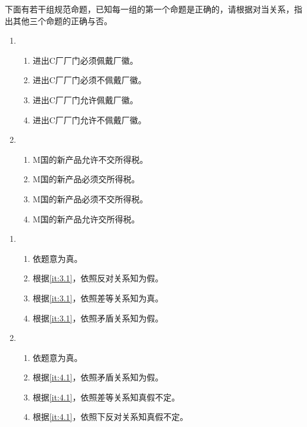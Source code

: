 \documentclass{ctexart}
\begin{document}
\begin{problem}\label{pro:5}
  下面有若干组规范命题，已知每一组的第一个命题是正确的，请根据对当关系，指出其他三个命题的正确与否。
  \begin{enumerate}
    \item
      \begin{enumerate}
        \item 进出C厂厂门必须佩戴厂徽。
        \item 进出C厂厂门必须不佩戴厂徽。
        \item 进出C厂厂门允许佩戴厂徽。
        \item 进出C厂厂门允许不佩戴厂徽。
      \end{enumerate}
    \item
      \begin{enumerate}
        \item M国的新产品允许不交所得税。
        \item M国的新产品必须交所得税。
        \item M国的新产品必须不交所得税。
        \item M国的新产品允许交所得税。
      \end{enumerate}
  \end{enumerate}
  \begin{solution}
    \begin{enumerate}
      \item
        \begin{enumerate}
          \item \label{it:3.1}依题意为真。
          \item 根据\ref{it:3.1}，依照反对关系知为假。
          \item 根据\ref{it:3.1}，依照差等关系知为真。
          \item 根据\ref{it:3.1}，依照矛盾关系知为假。
        \end{enumerate}
      \item
        \begin{enumerate}
          \item \label{it:4.1}依题意为真。
          \item 根据\ref{it:4.1}，依照矛盾关系知为假。
          \item 根据\ref{it:4.1}，依照差等关系知真假不定。
          \item 根据\ref{it:4.1}，依照下反对关系知真假不定。
        \end{enumerate}
    \end{enumerate}
  \end{solution}

\end{problem}
\end{document}
